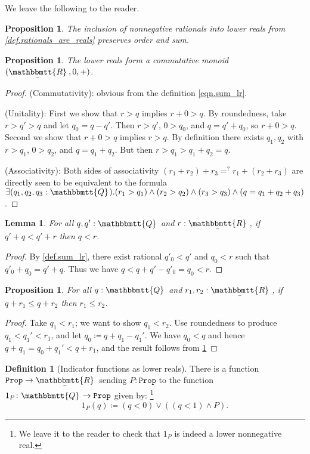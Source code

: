 \documentclass[11pt, oneside, article]{memoir}
\theoremstyle{plain}
\newtheorem{proposition}[theorem]{Proposition}
\newtheorem{lemma}[theorem]{Lemma}
\theoremstyle{definition}
\newtheorem{definition}[theorem]{Definition}
\theoremstyle{remark}
\newcommand{\const}[1]{\mathtt{#1}}
\newcommand{\ubar}[1]{\underaccent{\bar}{#1}}
\newcommand{\ind}[1]{1_{#1}}
\newcommand{\internal}[1]{\raisebox{-.03ex}{$\mathbbmtt{#1}$}}
\newcommand{\hs}{\hspace{1.1pt}}
\newcommand{\tqq}{\internal{Q}\hs}
\newcommand{\trr}{\internal{R}\hs}
\newcommand{\tlrr}{\ubar{\trr}\hs}
\newcommand{\prop}{\const{Prop}}
\begin{document}
We leave the following to the reader.
\begin{proposition}
The inclusion of nonnegative rationals into lower reals from \cref{def.rationals_are_reals} preserves order and sum.
\end{proposition}

\begin{proposition}
The lower reals form a commutative monoid $(\tlrr,0,+)$.
\end{proposition}
\begin{proof}
\noindent (Commutativity): obvious from the definition \eqref{eqn.sum_lr}.

\noindent (Unitality): First we show that $r>q$ implies $r+0>q$. By roundedness, take $r>q'>q$ and let $q_0=q-q'$. Then $r>q'$, $0>q_0$, and $q=q'+q_0$, so $r+0>q$. Second we show that $r+0>q$ implies $r>q$. By definition there exists $q_1,q_2$ with $r>q_1$, $0>q_2$, and $q=q_1+q_2$. But then $r>q_1>q_1+q_2=q$.

\noindent (Associativity): Both sides of associativity $(r_1+r_2)+r_3=^?r_1+(r_2+r_3)$ are directly seen to be equivalent to the formula $\exists(q_1,q_2,q_3:\tqq).(r_1>q_1)\wedge(r_2>q_2)\wedge(r_3>q_3)\wedge(q=q_1+q_2+q_3)$.
\end{proof}

\begin{lemma}\label{lemma.rational_cancellativity}
For all $q,q':\tqq$ and $r:\tlrr$, if $q'+q<q'+r$ then $q<r$.
\end{lemma}
\begin{proof}
By \cref{def.sum_lr}, there exist rational $q'_0<q'$ and $q_0<r$ such that $q'_0+q_0=q'+q$. Thus we have $q<q+q'-q'_0=q_0<r$.
\end{proof}

\begin{proposition}\label{prop.cancel_rationals}
For all $q:\tqq$ and $r_1,r_2:\tlrr$, if $q+r_1\leq q+r_2$ then $r_1\leq r_2$.
\end{proposition}
\begin{proof}
Take $q_1<r_1$; we want to show $q_1<r_2$. Use roundedness to produce $q_1<q_1'<r_1$, and let $q_0\coloneqq q+q_1-q_1'$. We have $q_0<q$ and hence $q+q_1=q_0+q_1'<q+r_1$, and the result follows from \cref{lemma.rational_cancellativity}
\end{proof}

\begin{definition}[Indicator functions as lower reals]\label{def.props_are_reals}
There is a function $\prop\to\tlrr$ sending $P:\prop$ to the function $\ind{P}\colon\tqq\to\prop$ given by:%
\footnote{We leave it to the reader to check that $\ind{P}$ is indeed a lower nonnegative real.}
\[\ind{P}(q)\coloneqq(q<0)\vee ((q<1)\wedge P).\]
\end{definition}
\end{document}
